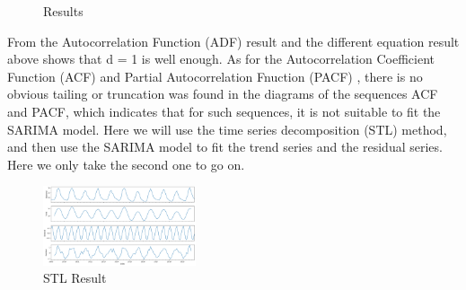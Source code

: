 \documentclass{mcmthesis}
\begin{document}
\begin{figure}[htbp]
\centering
{}
\quad
{}
\caption{Results}
\end{figure}
From the Autocorrelation Function (ADF) result and the different equation result above shows that d = 1 is well enough. As for the Autocorrelation Coefficient Function (ACF) and Partial Autocorrelation Fnuction (PACF) , there is no obvious tailing or truncation was found in the diagrams of the sequences ACF and PACF, which indicates that for such sequences, it is not suitable to fit the SARIMA model. Here we will use the time series decomposition (STL) method, and then use the SARIMA model to fit the trend series and the residual series. Here we only take the second one to go on.
\textbf{}
\begin{figure}[h]
\centering
\includegraphics[width=4.5cm]{./figures/season.png}
\caption{STL Result}
\end{figure}
\end{document}
